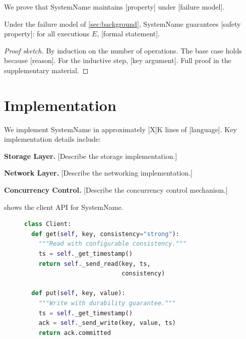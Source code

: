 \documentclass[sigplan,10pt]{acmart}
\newcommand{\system}{SystemName\xspace}
\newcommand{\para}[1]{\smallskip\noindent\textbf{#1.}}
\begin{document}

We prove that \system maintains [property] under [failure model].

\begin{theorem}
  \label{thm:safety}
  Under the failure model of \cref{sec:background}, \system
  guarantees [safety property]: for all executions $E$,
  [formal statement].
\end{theorem}

\begin{proof}[Proof sketch]
  By induction on the number of operations. The base case holds
  because [reason]. For the inductive step, [key argument].
  Full proof in the supplementary material.
\end{proof}

\section{Implementation}
\label{sec:implementation}

We implement \system in approximately [X]K lines of [language].
Key implementation details include:

\para{Storage Layer}
[Describe the storage implementation.]

\para{Network Layer}
[Describe the networking implementation.]

\para{Concurrency Control}
[Describe the concurrency control mechanism.]

 shows the client API for \system.

\begin{figure}[t]
\begin{lstlisting}[caption={Client API for \system. The interface
  provides [property] guarantees.}, label={lst:api},
  language=Python]
class Client:
  def get(self, key, consistency="strong"):
    """Read with configurable consistency."""
    ts = self._get_timestamp()
    return self._send_read(key, ts,
                           consistency)

  def put(self, key, value):
    """Write with durability guarantee."""
    ts = self._get_timestamp()
    ack = self._send_write(key, value, ts)
    return ack.committed
\end{lstlisting}
\end{figure}
\end{document}
